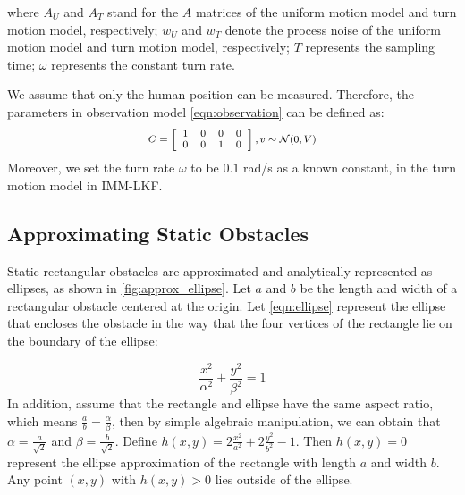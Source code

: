 \documentclass[letterpaper, 10 pt, conference]{ieeeconf}
\begin{document}
	where $A_U$ and $A_T$ stand for the $A$ matrices of the uniform motion model and turn motion model, respectively; $w_U$ and $w_T$ denote the process noise of the uniform motion model and turn motion model, respectively; $T$ represents the sampling time; $\omega$ represents the constant turn rate.
	
	We assume that only the human position can be measured.
	Therefore, the parameters in observation model \cref{eqn:observation} can be defined as:
	\small\begin{subequations}
		\scriptsize\begin{align*}
			C=\left[
			\begin{array}{cccc}
				1& 0& 0& 0\\
				0& 0& 1& 0
			\end{array}\right],
			v\sim\mathcal{N}(0,V)
		\end{align*}
	\end{subequations}\normalsize
	Moreover, we set the turn rate $\omega$ to be $0.1$ rad/s as a known constant, in the turn motion model in IMM-LKF. 
	
	\subsection{Approximating Static Obstacles}\label{subsec:ellip_approx}
	Static rectangular obstacles are approximated and analytically represented as ellipses, as shown in \cref{fig:approx_ellipse}.
	Let $a$ and $b$ be the length and width of a rectangular obstacle centered at the origin.
	Let \cref{eqn:ellipse} represent the ellipse that encloses the obstacle in the way that the four vertices of the rectangle lie on the boundary of the ellipse:
	\addtocounter{equation}{-2}
	
	\small	\begin{equation}\label{eqn:ellipse}
		\frac{x^2}{\alpha^2}+\frac{y^2}{\beta^2}=1
	\end{equation} \normalsize
	In addition, assume that the rectangle and ellipse have the same aspect ratio, which means $\frac{a}{b}=\frac{\alpha}{\beta}$, then by simple algebraic manipulation, we can obtain that $\alpha=\frac{a}{\sqrt{2}}$ and $\beta=\frac{b}{\sqrt{2}}$.
	Define $h(x,y)=2\frac{x^2}{a^2}+2\frac{y^2}{b^2}-1.$
	Then $h(x,y)=0$ represent the ellipse approximation of the rectangle with length $a$ and width $b$.
	Any point $(x,y)$ with $h(x,y)>0$ lies outside of the ellipse.
	
\end{document}
